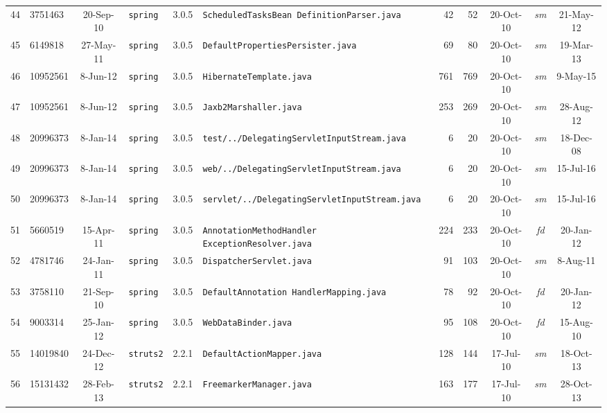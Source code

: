 \documentclass[sigconf,review, anonymous]{acmart}
\begin{document}
\begin{table}
{\begin{tabular}{r|l|c|l|c|p{5cm}|r|r|c|c|c}
			44 & 3751463 & 20-Sep-10 & \texttt{spring} & 3.0.5  & \texttt{ScheduledTasksBean \newline DefinitionParser.java}  & 42 & 52 & 20-Oct-10 & \textit{sm} & 21-May-12 \\
			45 & 6149818 & 27-May-11 & \texttt{spring} & 3.0.5  & \texttt{DefaultPropertiesPersister.java}  & 69 & 80 & 20-Oct-10 & \textit{sm} & 19-Mar-13 \\
			46 & 10952561 & 8-Jun-12 & \texttt{spring} & 3.0.5  & \texttt{HibernateTemplate.java}  & 761 & 769 & 20-Oct-10 & \textit{sm} & 9-May-15 \\
			47 & 10952561 & 8-Jun-12 & \texttt{spring} & 3.0.5  & \texttt{Jaxb2Marshaller.java}  & 253 & 269 & 20-Oct-10 & \textit{sm} & 28-Aug-12 \\
			48 & 20996373 & 8-Jan-14 & \texttt{spring} & 3.0.5  & \texttt{test/../\newline DelegatingServletInputStream.java}  & 6 & 20 & 20-Oct-10 & \textit{sm} & 18-Dec-08 \\
			49 & 20996373 & 8-Jan-14 & \texttt{spring} & 3.0.5  & \texttt{web/../\newline DelegatingServletInputStream.java}  & 6 & 20 & 20-Oct-10 & \textit{sm} & 15-Jul-16 \\
			50 & 20996373 & 8-Jan-14 & \texttt{spring} & 3.0.5  & \texttt{servlet/../\newline DelegatingServletInputStream.java}  & 6 & 20 & 20-Oct-10 & \textit{sm} & 15-Jul-16 \\
			51 & 5660519 & 15-Apr-11 & \texttt{spring} & 3.0.5 & \texttt{AnnotationMethodHandler \newline ExceptionResolver.java}  & 224 & 233 & 20-Oct-10 & \textit{fd} & 20-Jan-12 \\
			52 & 4781746 & 24-Jan-11 & \texttt{spring} & 3.0.5  & \texttt{DispatcherServlet.java}  & 91 & 103 & 20-Oct-10 & \textit{sm} & 8-Aug-11 \\
			53 & 3758110 & 21-Sep-10 & \texttt{spring} & 3.0.5  & \texttt{DefaultAnnotation \newline HandlerMapping.java}  & 78 & 92 & 20-Oct-10 & \textit{fd} & 20-Jan-12 \\
			54 & 9003314 & 25-Jan-12 & \texttt{spring} & 3.0.5  & \texttt{WebDataBinder.java} & 95 & 108 & 20-Oct-10 & \textit{fd} & 15-Aug-10 \\
			55 & 14019840 & 24-Dec-12 & \texttt{struts2} & 2.2.1  & \texttt{DefaultActionMapper.java}  & 128 & 144 & 17-Jul-10 & \textit{sm} & 18-Oct-13 \\
			56 & 15131432 & 28-Feb-13 & \texttt{struts2} & 2.2.1  & \texttt{FreemarkerManager.java}  & 163 & 177 & 17-Jul-10 & \textit{sm} & 28-Oct-13 \\

\end{tabular}}
\end{table}
\end{document}
